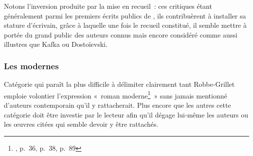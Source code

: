 \documentclass[12pt, a4paper]{article}
\begin{document}
Notons l'inversion produite par la mise en recueil~: ces critiques étant généralement parmi les premiers écrits publics de \robbe, ils contribuèrent à installer sa stature d'écrivain, grâce à laquelle une fois le recueil constitué, il semble mettre à portée du grand public des auteurs connus mais encore considéré comme aussi illustres que Kafka ou Dostoïevski.




\subsubsection{Les modernes}


Catégorie qui paraît la plus difficile à délimiter clairement tant Robbe-Grillet emploie volontier l'expression «~roman moderne\footnote{, p.~36, p.~38, p.~89}~» sans jamais mentionné d'auteurs contemporain qu'il y rattacherait. Plus encore que les autres cette catégorie doit être investie par le lecteur afin qu'il dégage lui-même les auteurs ou les œuvres citées qui semble devoir y être rattachés.
\end{document}
